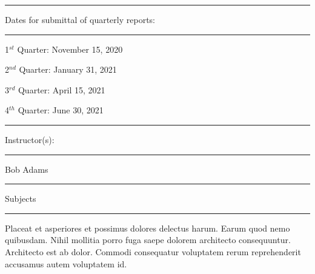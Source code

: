 \documentclass[10pt]{article}
\begin{document}
\begin{multicols}{2}

  \hrule

  \smallskip

  Dates for submittal of quarterly reports:
  
  \smallskip

  \hrule

  \bigskip 
  
  1$^{st}$ Quarter: November 15, 2020
  
  2$^{nd}$ Quarter: January 31, 2021
  
  3$^{rd}$ Quarter: April 15, 2021
  
  4$^{th}$ Quarter: June 30, 2021

  \vfill\null

  \columnbreak

  \hrule

  \vspace{2pt}
  
  Instructor(s):

  \vspace{1pt}

  \hrule
  
  \bigskip
  
  Bob Adams

\end{multicols}

\begin{center}

  \hrule
  
  \smallskip
  
  Subjects

  \smallskip
  
  \hrule
\end{center}

Placeat et asperiores et possimus dolores delectus harum. Earum quod
nemo quibusdam. Nihil mollitia porro fuga saepe dolorem architecto
consequuntur. Architecto est ab dolor. Commodi consequatur voluptatem
rerum reprehenderit accusamus autem voluptatem id.
\end{document}
